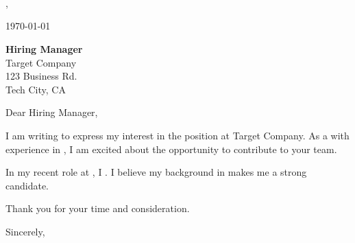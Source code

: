 \documentclass[a4paper,11pt]{article}
\begin{document}
\noindent \textbf{} \\
 \\
 \\
, 

\vspace{1cm}

\noindent \today

\vspace{1cm}

\noindent \textbf{Hiring Manager} \\
Target Company \\
123 Business Rd. \\
Tech City, CA

\vspace{1cm}

\noindent Dear Hiring Manager,

\vspace{0.5cm}

\noindent I am writing to express my interest in the position at Target Company. As a  with experience in , I am excited about the opportunity to contribute to your team.

\vspace{0.5cm}

\noindent In my recent role at , I . I believe my background in  makes me a strong candidate.

\vspace{0.5cm}

\noindent Thank you for your time and consideration.

\vspace{1cm}

\noindent Sincerely,

\vspace{1cm}

\noindent {}
\end{document}
